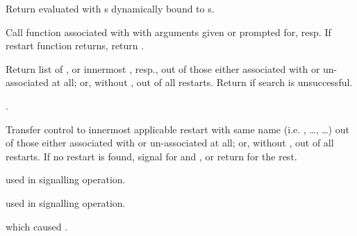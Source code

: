 \begin{LIST}{1cm}
  Return  evaluated with s 
  dynamically bound to s.

  Call function associated with  with arguments given or
  prompted for, resp. If restart function returns, return .

  Return list of , or innermost 
  , resp., out of those either associated
  with  or un-associated at all; or, without
  , out of all restarts. Return \retval{\NIL} if search
  is unsuccessful.

  .

  Transfer control to innermost applicable restart with same name
  (i.e. , \ldots,  \ldots) out of those either associated
  with  or un-associated at all; or, without
  , out of all restarts. If no restart is found,
  signal  for  and ,
  or return \retval{\NIL} for the rest.

   used in signalling operation.

   used in signalling operation.

   which caused .


\end{LIST}
